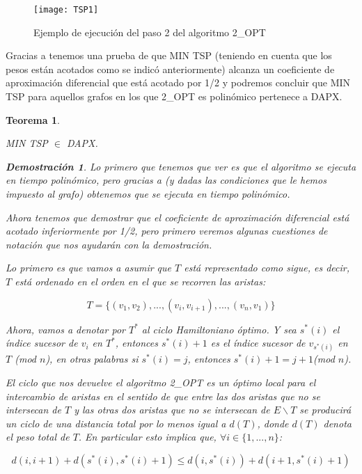 \documentclass[a4paper,12pt,titlepage]{article}
\newtheorem{teo}{Teorema}[section]
\newtheorem*{dem}{\textbf{Demostraci\'on}}
\begin{document}
\begin{figure}[h]
\centering
\texttt{[image: TSP1]}
\caption{Ejemplo de ejecuci\'on del paso 2 del algoritmo 2\_OPT}
\end{figure}

Gracias a \cite{TSP2} tenemos una prueba de que MIN TSP (teniendo en cuenta que los pesos est\'an acotados como se indic\'o anteriormente) alcanza un coeficiente de aproximaci\'on diferencial que est\'a acotado por 1/2 y podremos concluir que MIN TSP para aquellos grafos en los que 2\_OPT es polin\'omico pertenece a DAPX.

\begin{teo}
\label{tsp:teo:1}

MIN TSP $\in$ DAPX.

\begin{dem}

Lo primero que tenemos que ver es que el algoritmo se ejecuta en tiempo polin\'omico, pero gracias a \cite{TSP2} (y dadas las condiciones que le hemos impuesto al grafo) obtenemos que se ejecuta en tiempo polin\'omico.

Ahora tenemos que demostrar que el coeficiente de aproximaci\'on diferencial est\'a acotado inferiormente por 1/2, pero primero veremos algunas cuestiones de notaci\'on que nos ayudar\'an con la demostraci\'on.

Lo primero es que vamos a asumir que $T$ est\'a representado como sigue, es decir, $T$ est\'a ordenado en el orden en el que se recorren las aristas:

\begin{equation} \label{tsp:eq:1}
T=\{ (v_1,v_2),...,(v_i,v_{i+1}),...,(v_n,v_1) \}
\end{equation}

Ahora, vamos a denotar por $T^*$ al ciclo Hamiltoniano \'optimo. Y sea $s^*(i)$ el \'indice sucesor de $v_i$ en $T^*$, entonces $s^*(i)+1$ es el \'indice sucesor de $v_{s^*(i)}$ en $T$ (mod $n$), en otras palabras si $s^*(i) = j$, entonces $s^*(i)+1 = j+1 $(mod $n$).

El ciclo que nos devuelve el algoritmo 2\_OPT es un \'optimo local para el intercambio de aristas en el sentido de que entre las dos aristas que no se intersecan de $T$ y las otras dos aristas que no se intersecan de $E\backslash T$ se producir\'a un ciclo de una distancia total por lo menos igual a $d(T)$, donde $d(T)$ denota el peso total de $T$. En particular esto implica que, $\forall i \in \{1,...,n\}$:

\begin{equation} \label{tsp:eq:2}
d(i,i+1)+d(s^*(i),s^*(i)+1) \leq d(i,s^*(i))+d(i+1,s^*(i)+1)
\end{equation}


\end{dem}
\end{teo}
\end{document}

